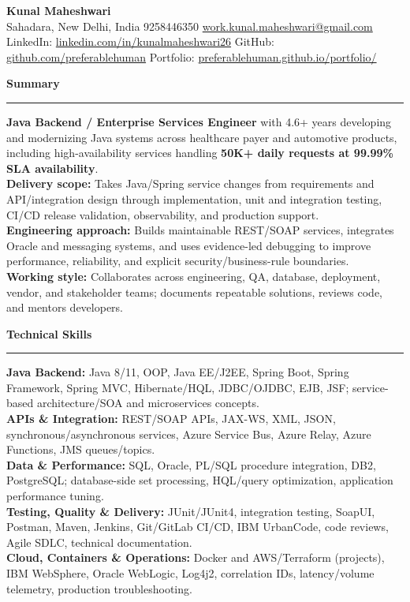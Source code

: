 \documentclass[11pt,letterpaper]{article}
\newcommand{\ressection}[1]{\Needspace{6\baselineskip}\vspace{8pt}\par\textbf{#1}\par\vspace{2pt}\hrule\vspace{5pt}}
\begin{document}
\pagestyle{empty}\raggedright\fontsize{11}{12.5}\selectfont

{\Large \textbf{Kunal Maheshwari}}\\
Sahadara, New Delhi, India \textbar{} 9258446350 \textbar{} \href{mailto:work.kunal.maheshwari@gmail.com}{work.kunal.maheshwari@gmail.com}\\
LinkedIn: \href{https://www.linkedin.com/in/kunalmaheshwari26}{linkedin.com/in/kunalmaheshwari26} \textbar{} GitHub: \href{https://github.com/preferablehuman}{github.com/preferablehuman} \textbar{} Portfolio: \href{https://preferablehuman.github.io/portfolio/}{preferablehuman.github.io/portfolio/}

\ressection{Summary}
\textbf{Java Backend / Enterprise Services Engineer} with 4.6+ years developing and modernizing Java systems across healthcare payer and automotive products, including high-availability services handling \textbf{50K+ daily requests at 99.99\% SLA availability}.\\[2pt]
\textbf{Delivery scope:} Takes Java/Spring service changes from requirements and API/integration design through implementation, unit and integration testing, CI/CD release validation, observability, and production support.\\[2pt]
\textbf{Engineering approach:} Builds maintainable REST/SOAP services, integrates Oracle and messaging systems, and uses evidence-led debugging to improve performance, reliability, and explicit security/business-rule boundaries.\\[2pt]
\textbf{Working style:} Collaborates across engineering, QA, database, deployment, vendor, and stakeholder teams; documents repeatable solutions, reviews code, and mentors developers.

\ressection{Technical Skills}
\textbf{Java Backend:} Java 8/11, OOP, Java EE/J2EE, Spring Boot, Spring Framework, Spring MVC, Hibernate/HQL, JDBC/OJDBC, EJB, JSF; service-based architecture/SOA and microservices concepts.\\
\textbf{APIs \& Integration:} REST/SOAP APIs, JAX-WS, XML, JSON, synchronous/asynchronous services, Azure Service Bus, Azure Relay, Azure Functions, JMS queues/topics.\\
\textbf{Data \& Performance:} SQL, Oracle, PL/SQL procedure integration, DB2, PostgreSQL; database-side set processing, HQL/query optimization, application performance tuning.\\
\textbf{Testing, Quality \& Delivery:} JUnit/JUnit4, integration testing, SoapUI, Postman, Maven, Jenkins, Git/GitLab CI/CD, IBM UrbanCode, code reviews, Agile SDLC, technical documentation.\\
\textbf{Cloud, Containers \& Operations:} Docker and AWS/Terraform (projects), IBM WebSphere, Oracle WebLogic, Log4j2, correlation IDs, latency/volume telemetry, production troubleshooting.
\end{document}
